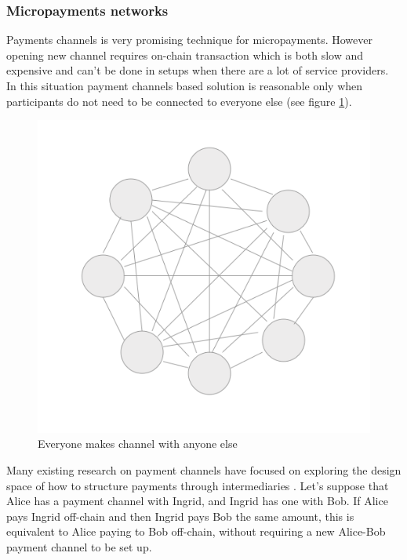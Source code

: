 \documentclass[a4paper,12pt]{article}
\begin{document}
\subsubsection{Micropayments networks}

Payments channels is very promising technique for micropayments. However opening 
new channel requires on-chain transaction which is both slow and expensive and 
can't be done in setups when there are a lot of service providers. In this 
situation payment channels based solution is reasonable only when participants 
do not need to be connected to everyone else (see figure \ref{img:many-to-many}). 

\begin{figure}[H]
    \centering
    \includegraphics[scale=0.5]{img/many-to-many}
    \caption{Everyone makes channel with anyone else}
    \label{img:many-to-many}
\end{figure}

Many existing research on payment channels have focused on exploring the design
space of how to structure payments through intermediaries \cite{counterfactual, 
perun, lightning}. Let's suppose that Alice has a payment channel with Ingrid, and 
Ingrid has one with Bob. If Alice pays Ingrid off-chain and then Ingrid pays Bob 
the same amount, this is equivalent to Alice paying to Bob off-chain, without 
requiring a new Alice-Bob payment channel to be set up.
\end{document}
